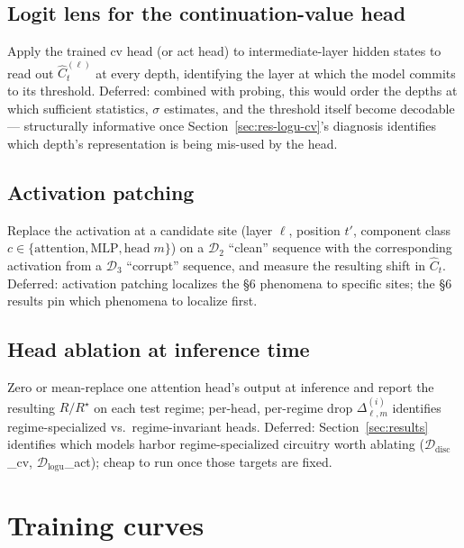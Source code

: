 \documentclass[11pt]{article}
\begin{document}
\subsection{Logit lens for the continuation-value head}
\label{sec:fw-logit-lens}

Apply the trained cv head (or act head) to intermediate-layer hidden states to read out $\widehat C_t^{(\ell)}$ at every depth, identifying the layer at which the model commits to its threshold. Deferred: combined with probing, this would order the depths at which sufficient statistics, $\sigma$ estimates, and the threshold itself become decodable --- structurally informative once Section~\ref{sec:res-logu-cv}'s diagnosis identifies which depth's representation is being mis-used by the head.

\subsection{Activation patching}
\label{sec:fw-patching}

Replace the activation at a candidate site (layer $\ell$, position $t'$, component class $c \in \{\text{attention}, \text{MLP}, \text{head}\;m\}$) on a $\mathcal{D}_2$ ``clean'' sequence with the corresponding activation from a $\mathcal{D}_3$ ``corrupt'' sequence, and measure the resulting shift in $\widehat C_t$. Deferred: activation patching localizes the §6 phenomena to specific sites; the §6 results pin which phenomena to localize first.

\subsection{Head ablation at inference time}
\label{sec:fw-ablation}

Zero or mean-replace one attention head's output at inference and report the resulting $R/R^\star$ on each test regime; per-head, per-regime drop $\Delta_{\ell,m}^{(i)}$ identifies regime-specialized vs.\ regime-invariant heads. Deferred: Section~\ref{sec:results} identifies which models harbor regime-specialized circuitry worth ablating ($\mathcal{D}_{\mathrm{disc}}$\_cv, $\mathcal{D}_{\mathrm{logu}}$\_act); cheap to run once those targets are fixed.

\appendix

\section{Training curves}
\label{app:training}
\end{document}

